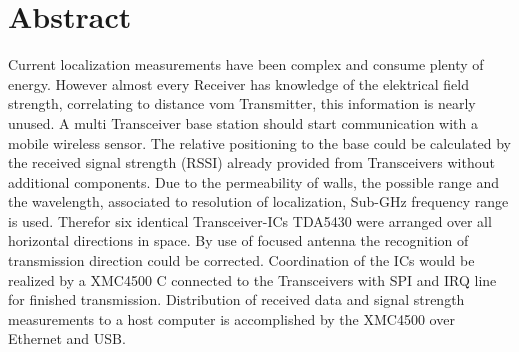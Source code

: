 \newpage
\chapter*{Abstract}
\label{sec:abstract}
\pagestyle{scrheadings}

Current localization measurements have been complex and consume plenty of energy. However almost every Receiver has knowledge of the elektrical field strength, correlating to distance vom Transmitter, this information is nearly unused. A multi Transceiver base station should start communication with a mobile wireless sensor. The relative positioning to the base could be calculated by the received signal strength (RSSI) already provided from Transceivers without additional components. Due to the permeability of walls, the possible range and the wavelength, associated to resolution of localization,   Sub-GHz frequency range is used.  Therefor six identical Transceiver-ICs TDA5430 were arranged over all horizontal directions in space. By use of focused antenna the recognition of transmission direction could be corrected. Coordination of the ICs would be realized by a XMC4500 \textmu C connected to the Transceivers with SPI and IRQ line for finished transmission. Distribution of received data and signal strength measurements to a host computer is accomplished by the XMC4500 over Ethernet and USB.